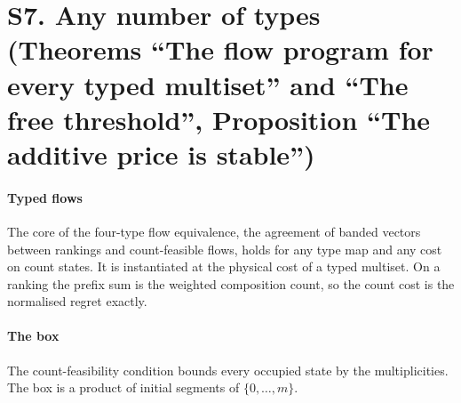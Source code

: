 
\section{S7. Any number of types (Theorems ``The flow program for every typed multiset'' and
``The free threshold'', Proposition ``The additive price is stable'')}

\paragraph{Typed flows} The core of the four-type flow equivalence, the agreement of banded
vectors between rankings and count-feasible flows, holds for any type map and any cost on
count states. It is instantiated at the physical cost of a typed multiset. On a ranking the prefix
sum is the weighted composition count, so the count cost is the normalised regret exactly.

\paragraph{The box} The count-feasibility condition bounds every occupied state by the
multiplicities. The box is a product of initial segments of $\{0,\dots,m\}$.

